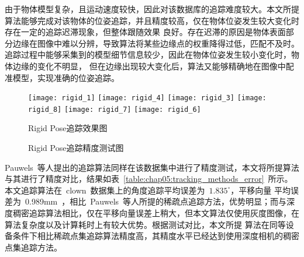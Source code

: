 由于物体模型复杂，且运动速度较快，因此对该数据库的追踪难度较大。本文所提算法能够完成对该物体的位姿追踪，并且精度较高，仅在物体位姿发生较大变化时存在一定的追踪迟滞现象，但整体跟随效果
良好。存在迟滞的原因是物体表面部分边缘在图像中难以分辨，导致算法将某些边缘点的权重降得过低，匹配不及时。追踪过程中能够采集到的模型细节信息较少，因此在物体位姿发生较小变化时，物体边缘的变化不明显，
但在边缘出现较大变化后，算法又能够精确地在图像中配准模型，实现准确的位姿追踪。

\begin{figure}[b] %
    \centering%
      \texttt{[image: rigid\_1]}
      \texttt{[image: rigid\_4]}
      \texttt{[image: rigid\_3]}
      \vskip 1pt
      \texttt{[image: rigid\_8]}
      \texttt{[image: rigid\_7]}
      \texttt{[image: rigid\_6]}
    \caption{Rigid Pose追踪效果图}
    \label{fig:chap05:rigidpose_track}
    \end{figure}


    \begin{sidewaysfigure}
        \centering
        \hspace{0.1em}
        \hspace{0.1em}
        \vskip 0.3cm
        \hspace{0.1em}
        \hspace{0.1em}
        \caption{Rigid Pose追踪精度测试图}
        \label{fig:chap05:rigidpose_rig_track}
    \end{sidewaysfigure}

Pauwels\cite{PauwelsRealTimePoseDetection2016}~等人提出的追踪算法同样在该数据集中进行了精度测试，本文将所提算法与其进行了精度对比，结果如表~\ref{table:chap05:tracking_methods_error}~所示。本文追踪算法在~clown~数据集上的角度追踪平均误差为~$1.835^\circ$，平移向量
平均误差为~0.989mm~，相比~Pauwels~等人所提的稀疏点追踪方法，优势明显；而与深度稠密追踪算法相比，仅在平移向量误差上稍大，但本文算法仅使用灰度图像，在算法复杂度以及计算耗时上有较大优势。根据测试对比，本文所提
算法在同等设备条件下相比稀疏点集追踪算法精度高，其精度水平已经达到使用深度相机的稠密点集追踪方法。

